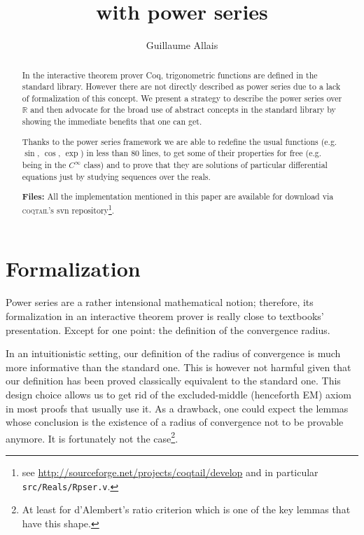 \documentclass[submission,copyright]{eptcs}
\title{\coq{} with power series}
\author{Guillaume Allais
\institute{Junior Laboratory \coqtail{}\\
Ens Lyon - France\\}
\email{guillaume.allais@ens-lyon.org}}
\newcommand{\coq}{Coq}
\newcommand{\coqtail}{\textsc{coqtail}}
\newcommand{\R}{\mathbb{R}}
\begin{document}
\maketitle

\begin{abstract}
In the interactive theorem prover \coq{}, trigonometric functions are
defined in the standard library. However there are not directly described
as power series  due to a lack of formalization of this concept.
We present a strategy to describe the power series over $\R$ and then
advocate for the broad use of abstract concepts in the standard
library by showing the immediate benefits that one can get.

Thanks to the power series framework we are able to redefine the usual
functions (e.g. $\sin$, $\cos$, $\exp$) in less than 80 lines,
to get some of their properties for free (e.g. being in the $C^{\infty}$
class) and to prove that they are solutions of particular differential
equations just by studying sequences over the reals.

\textbf{Files:} All the implementation mentioned in this paper are
available for download via \coqtail{}'s svn repository\footnote{see
\url{http://sourceforge.net/projects/coqtail/develop}
and in particular \texttt{src/Reals/Rpser.v}.}.

\end{abstract}

\section{Formalization}

Power series are a rather intensional mathematical notion; therefore, its 
formalization in an interactive theorem prover is really close to  
textbooks' presentation. Except for one point: the definition of the
convergence radius.

In an intuitionistic setting, our definition of the radius of convergence
is much more informative than the standard one.  This is however not
harmful given that our definition has been proved classically equivalent
to the standard one. This design choice allows us to get rid of the
excluded-middle (henceforth EM) axiom in most proofs that usually use
it. As a drawback, one could expect the lemmas whose conclusion is the
existence of a radius of convergence not to be provable anymore. It is
fortunately not the case\footnote{At least for d'Alembert's ratio criterion
which is one of the key lemmas that have this shape.}.
\end{document}
